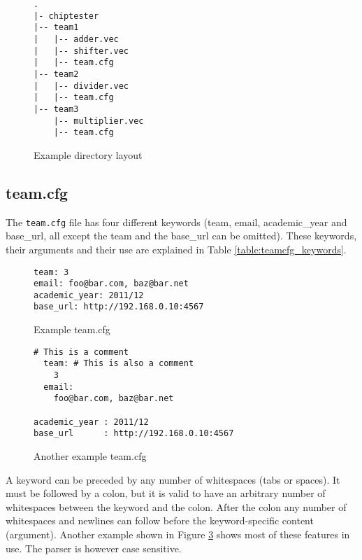 \begin{figure}[h!]
\lstset{basicstyle=\scriptsize\ttfamily}
\begin{lstlisting}
.
|- chiptester
|-- team1
|   |-- adder.vec
|   |-- shifter.vec
|   |-- team.cfg
|-- team2
|   |-- divider.vec
|   |-- team.cfg
|-- team3
    |-- multiplier.vec
    |-- team.cfg
\end{lstlisting}
\caption{Example directory layout}
\label{listing:dir_layout}
\end{figure}

\subsection{team.cfg}
The \texttt{team.cfg} file has four different keywords (team, email,
academic\_year and base\_url, all except the team and the base\_url can be omitted).
These keywords, their arguments and their use are explained in Table \ref{table:teamcfg_keywords}.

\begin{figure}[h!]
\lstset{basicstyle=\scriptsize\ttfamily}
\begin{lstlisting}
team: 3
email: foo@bar.com, baz@bar.net
academic_year: 2011/12
base_url: http://192.168.0.10:4567
\end{lstlisting}
\caption{Example team.cfg}
\label{listing:teamcfg_example1}
\end{figure}



\begin{figure}[h!]
\lstset{basicstyle=\scriptsize\ttfamily}
\begin{lstlisting}
# This is a comment
  team: # This is also a comment
    3
  email:
    foo@bar.com, baz@bar.net

academic_year : 2011/12
base_url      : http://192.168.0.10:4567
\end{lstlisting}
\caption{Another example team.cfg}
\label{listing:teamcfg_example2}
\end{figure}


A keyword can be preceded by any number of whitespaces (tabs or spaces). It must be followed
by a colon, but it is valid to have an arbitrary number of whitespaces between the keyword
and the colon. After the colon any number of whitespaces and newlines can follow before
the keyword-specific content (argument). Another example shown in Figure \ref{listing:teamcfg_example2} shows most of these features
in use. The parser is however case sensitive.

